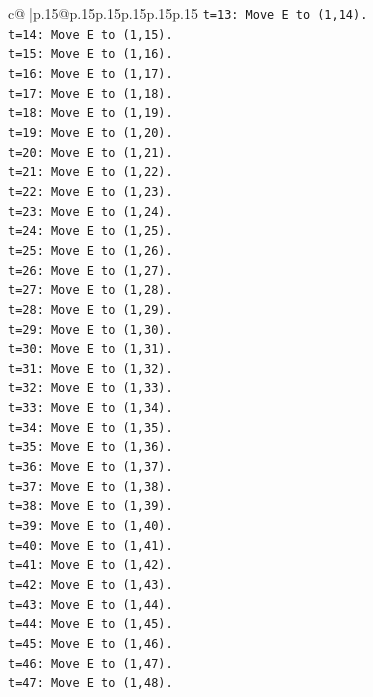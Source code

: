 \documentclass{article}
\begin{document}
{\begin{supertabular}{c@{$\;$}|p{.15\linewidth}@{}p{.15\linewidth}p{.15\linewidth}p{.15\linewidth}p{.15\linewidth}p{.15\linewidth}}
{{{\texttt{t=13: Move E to (1,14).} \\
\texttt{t=14: Move E to (1,15).} \\
\texttt{t=15: Move E to (1,16).} \\
\texttt{t=16: Move E to (1,17).} \\
\texttt{t=17: Move E to (1,18).} \\
\texttt{t=18: Move E to (1,19).} \\
\texttt{t=19: Move E to (1,20).} \\
\texttt{t=20: Move E to (1,21).} \\
\texttt{t=21: Move E to (1,22).} \\
\texttt{t=22: Move E to (1,23).} \\
\texttt{t=23: Move E to (1,24).} \\
\texttt{t=24: Move E to (1,25).} \\
\texttt{t=25: Move E to (1,26).} \\
\texttt{t=26: Move E to (1,27).} \\
\texttt{t=27: Move E to (1,28).} \\
\texttt{t=28: Move E to (1,29).} \\
\texttt{t=29: Move E to (1,30).} \\
\texttt{t=30: Move E to (1,31).} \\
\texttt{t=31: Move E to (1,32).} \\
\texttt{t=32: Move E to (1,33).} \\
\texttt{t=33: Move E to (1,34).} \\
\texttt{t=34: Move E to (1,35).} \\
\texttt{t=35: Move E to (1,36).} \\
\texttt{t=36: Move E to (1,37).} \\
\texttt{t=37: Move E to (1,38).} \\
\texttt{t=38: Move E to (1,39).} \\
\texttt{t=39: Move E to (1,40).} \\
\texttt{t=40: Move E to (1,41).} \\
\texttt{t=41: Move E to (1,42).} \\
\texttt{t=42: Move E to (1,43).} \\
\texttt{t=43: Move E to (1,44).} \\
\texttt{t=44: Move E to (1,45).} \\
\texttt{t=45: Move E to (1,46).} \\
\texttt{t=46: Move E to (1,47).} \\
\texttt{t=47: Move E to (1,48).} \\
}}}
\end{supertabular}}
\end{document}
